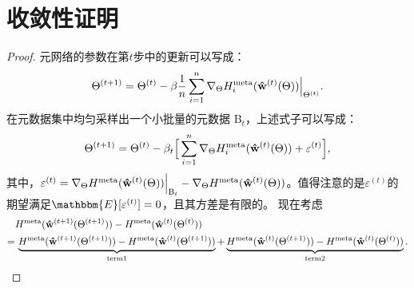 \section{收敛性证明}
\label{chap6_2}


\begin{proof}
元网络的参数在第$t$步中的更新可以写成：
\begin{equation}
     \Theta^{(t+1)} = \Theta^{(t)} - \beta \frac{1}{n} \sum\limits_{i=1}^n
     \nabla_\Theta H_i^{\rm meta}(\mathbf{\hat w}^{(t)}(\Theta)) \Big{|}_{\Theta^{(t)}}. 
\end{equation}
在元数据集中均匀采样出一个小批量的元数据 $\mathrm{B}_t$，上述式子可以写成：
\begin{equation}
     \Theta^{(t+1)} = \Theta^{(t)} - \beta_t \Big{[}
     \sum\limits_{i=1}^n
     \nabla_\Theta H_i^{\rm meta}(\mathbf{\hat w}^{(t)}(\Theta)) + \varepsilon^{(t)} \Big{]}, 
\end{equation}
其中，$\varepsilon^{(t)} =  \nabla_\Theta H^{\rm meta}(\mathbf{\hat w}^{(t)}(\Theta)) \Big{|}_{{\rm B}_t} - \nabla_\Theta H^{\rm meta}(\mathbf{\hat w}^{(t)}(\Theta))$。值得注意的是$\varepsilon^{(t)}$的期望满足$\mathbbm{E}[\varepsilon^{(t)}]=0$，且其方差是有限的。
现在考虑
\begin{equation}
   \begin{aligned}
   \label{eq:eq26}
       & H^{\rm meta}(\mathbf{\hat w}^{(t+1)}(\Theta^{(t+1)})) - 
    H^{\rm meta}(\mathbf{\hat w}^{(t)}(\Theta^{(t)})) \\
    = &  \, \underbrace{H^{\rm meta}(\mathbf{\hat w}^{(t+1)}(\Theta^{(t+1)})) - 
    H^{\rm meta}(\mathbf{\hat w}^{(t)}(\Theta^{(t +1 )}))}_{\rm term 1} +
    \underbrace{H^{\rm meta}(\mathbf{\hat w}^{(t)}(\Theta^{(t+1)})) - 
    H^{\rm meta}(\mathbf{\hat w}^{(t)}(\Theta^{(t)}))}_{\rm term 2}.
   \end{aligned}
\end{equation}


\end{proof}
